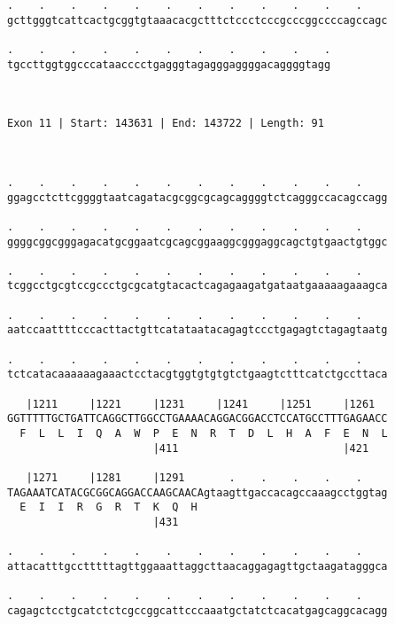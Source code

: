 \documentclass{article}
\begin{document}
\begin{Verbatim}
.    .    .    .    .    .    .    .    .    .    .    .    
gcttgggtcattcactgcggtgtaaacacgctttctccctcccgcccggccccagccagc
                                                            
.    .    .    .    .    .    .    .    .    .    .
tgccttggtggcccataacccctgagggtagagggaggggacaggggtagg
                                                   
                                                   
 
Exon 11 | Start: 143631 | End: 143722 | Length: 91



.    .    .    .    .    .    .    .    .    .    .    .    
ggagcctcttcggggtaatcagatacgcggcgcagcaggggtctcagggccacagccagg
                                                            
.    .    .    .    .    .    .    .    .    .    .    .    
ggggcggcgggagacatgcggaatcgcagcggaaggcgggaggcagctgtgaactgtggc
                                                            
.    .    .    .    .    .    .    .    .    .    .    .    
tcggcctgcgtccgccctgcgcatgtacactcagagaagatgataatgaaaaagaaagca
                                                            
.    .    .    .    .    .    .    .    .    .    .    .    
aatccaattttcccacttactgttcatataatacagagtccctgagagtctagagtaatg
                                                            
.    .    .    .    .    .    .    .    .    .    .    .    
tctcatacaaaaaagaaactcctacgtggtgtgtgtctgaagtctttcatctgccttaca
                                                            
   |1211     |1221     |1231     |1241     |1251     |1261  
GGTTTTTGCTGATTCAGGCTTGGCCTGAAAACAGGACGGACCTCCATGCCTTTGAGAACC
  F  L  L  I  Q  A  W  P  E  N  R  T  D  L  H  A  F  E  N  L
                       |411                          |421   
  
   |1271     |1281     |1291       .    .    .    .    .    
TAGAAATCATACGCGGCAGGACCAAGCAACAgtaagttgaccacagccaaagcctggtag
  E  I  I  R  G  R  T  K  Q  H                              
                       |431                                 
  
.    .    .    .    .    .    .    .    .    .    .    .    
attacatttgcctttttagttggaaattaggcttaacaggagagttgctaagatagggca
                                                            
.    .    .    .    .    .    .    .    .    .    .    .    
cagagctcctgcatctctcgccggcattcccaaatgctatctcacatgagcaggcacagg
                                                            

\end{Verbatim}
\end{document}
